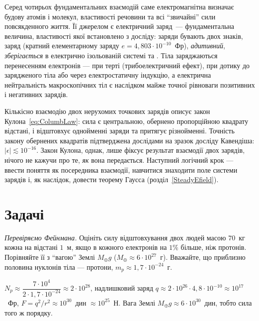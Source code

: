 Серед чотирьох фундаментальних взаємодій саме електромагнітна визначає будову атомів і
молекул, властивості речовини та всі \enquote{звичайні} сили повсякденного життя. Її
джерелом є електричний заряд~--- фундаментальна величина, властивості якої встановлено з
досліду: заряди бувають двох знаків, заряд  (кратний елементарному
заряду $e = 4{,}803\cdot10^{-10}$~Фр), \emph{адитивний}, \emph{зберігається} в електрично
ізольованій системі та . Тіла заряджаються
перенесенням електронів --- при терті (трибоелектричний ефект), при дотику до зарядженого
тіла або через електростатичну індукцію, а електрична нейтральність макроскопічних тіл є
наслідком майже точної рівноваги позитивних і негативних зарядів.

Кількісно взаємодію двох нерухомих точкових зарядів описує закон
Кулона~\eqref{eq:ColumbLaw}: сила є центральною, обернено пропорційною квадрату відстані,
і відштовхує однойменні заряди та притягує різнойменні. Точність закону обернених
квадратів підтверджена дослідами на зразок досліду Кавендіша:
$|\epsilon| \lesssim 10^{-16}$. Закон Кулона, однак, лише фіксує результат взаємодії двох
зарядів, нічого не кажучи про те, \emph{як} вона передається. Наступний логічний крок ---
ввести поняття  як посередника взаємодії, навчитися знаходити
поле системи зарядів і, як наслідок, довести теорему Гаусса
(розділ~\ref{SteadyEfield}).

\section*{Задачі}
 {}


\begin{problem}\label{prb:FeynmanEstimate}
	\emph{Перевіряємо Фейнмана.}
	Оцініть силу відштовхування двох людей масою $70$~кг
	кожна на відстані $1$~м, якщо в кожного електронів на $1\%$ більше, ніж протонів.
	Порівняйте її з \enquote{вагою} Землі $M_\oplus g$ ($M_\oplus\approx6\cdot10^{27}$~г). Вважайте, що приблизно
	половина нуклонів тіла --- протони, $m_p\approx1{,}7\cdot10^{-24}$~г.
	\begin{solution}
		$N_p\approx\dfrac{7\cdot10^{4}}{2\cdot1{,}7\cdot10^{-24}}\approx2\cdot10^{28}$, надлишковий заряд $q\approx2\cdot10^{26}\cdot4{,}8\cdot10^{-10}\approx10^{17}$~Фр, $F=q^2/r^2\approx10^{30}$~дин $\approx10^{25}$~Н. Вага Землі $M_\oplus g\approx6\cdot10^{30}$~дин, тобто сила того ж порядку.
	\end{solution}
\end{problem}

